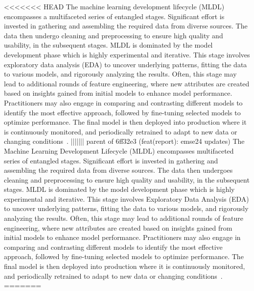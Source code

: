 <<<<<<< HEAD
The machine learning development lifecycle (MLDL) encompasses a multifaceted series of entangled stages. Significant effort is invested in gathering and assembling the required data from diverse sources. The data then undergo cleaning and preprocessing to ensure high quality and usability, in the subsequent stages. MLDL is dominated by the model development phase which is highly experimental and iterative. This stage involves exploratory data analysis (EDA) to uncover underlying patterns, fitting the data to various models, and rigorously analyzing the results. Often, this stage may lead to additional rounds of feature engineering, where new attributes are created based on insights gained from initial models to enhance model performance. Practitioners may also engage in comparing and contrasting different models to identify the most effective approach, followed by fine-tuning selected models to optimize performance. The final model is then deployed into production where it is continuously monitored, and periodically retrained to adapt to new data or changing conditions~\cite{haakman2021ai,amershi2019software,sculley2015hidden}.
||||||| parent of 6ff32e3 (feat(report): emse24 updates)
The Machine Learning Development Lifecycle (MLDL) encompasses multifaceted series of entangled stages. Significant effort is invested in gathering and assembling the required data from diverse sources. The data then undergoes cleaning and preprocessing to ensure high quality and usability, in the subsequent stages. MLDL is dominated by the model development phase which is highly experimental and iterative. This stage involves Exploratory Data Analysis (EDA) to uncover underlying patterns, fitting the data to various models, and rigorously analyzing the results. Often, this stage may lead to additional rounds of feature engineering, where new attributes are created based on insights gained from initial models to enhance model performance. Practitioners may also engage in comparing and contrasting different models to identify the most effective approach, followed by fine-tuning selected models to optimize performance. The final model is then deployed into production where it is continuously monitored, and periodically retrained to adapt to new data or changing conditions~\cite{haakman2021ai,amershi2019software,sculley2015hidden}.
=======
